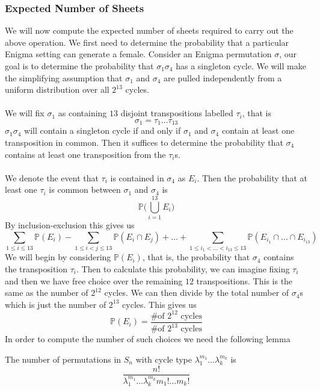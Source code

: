 \subsubsection{Expected Number of Sheets}
We will now compute the expected number of sheets required to carry out the above operation. We first need to determine the probability that a particular Enigma setting can generate a female. Consider an Enigma permutation $\sigma$, our goal is to determine the probability that $\sigma_1\sigma_4$ has a singleton cycle. We will make the simplifying assumption that $\sigma_1$ and $\sigma_4$ are pulled independently from a uniform distribution over all $2^{13}$ cycles.
\\\\We will fix $\sigma_1$ as containing $13$ disjoint transpositions labelled $\tau_i$, that is
\[
	\sigma_1 = \tau_1\dots\tau_{13}
\]
$\sigma_1\sigma_4$ will contain a singleton cycle if and only if $\sigma_1$ and $\sigma_4$ contain at least one transposition in common. Then it suffices to determine the probability that $\sigma_4$ contains at least one transposition from the $\tau_i$s.
\\\\We denote the event that $\tau_i$ is contained in $\sigma_4$ as $E_i$. Then the probability that at least one $\tau_i$ is common between $\sigma_1$ and $\sigma_4$ is
\[
	\mathbb{P}\biggl(\bigcup_{i=1}^{13}E_i\biggr)
\]
By inclusion-exclusion this gives us
\[
	\sum_{1 \le i \le 13}\mathbb{P}(E_i) - \sum_{1\le i < j \le 13}\mathbb{P}(E_i\cap E_j) + \dots + \sum_{1\le i_1 < \dots < i_{13} \le 13}\mathbb{P}(E_{i_1}\cap\dots\cap E_{i_{13}})
\]
We will begin by considering $\mathbb{P}(E_i)$, that is, the probability that $\sigma_4$ contains the transposition $\tau_i$. Then to calculate this probability, we can imagine fixing $\tau_i$ and then we have free choice over the remaining $12$ transpositions. This is the same as the number of $2^{12}$ cycles. We can then divide by the total number of $\sigma_4$s which is just the number of $2^{13}$ cycles. This gives us
\[
	\mathbb{P}(E_i) = \frac{\text{\# of }2^{12}\text{ cycles}}{\text{\# of }2^{13}\text{ cycles}}
\]
In order to compute the number of such choices we need the following lemma
\begin{lemma}
	\label{lem:num_cycle_type}
	The number of permutations in $S_n$ with cycle type $\lambda_1^{m_1}\dots\lambda_k^{m_k}$ is
	\[
		\frac{n!}{\lambda_1^{m_1}\dots\lambda_k^{m_k}m_1!\dots m_k!}
	\]
\end{lemma}
